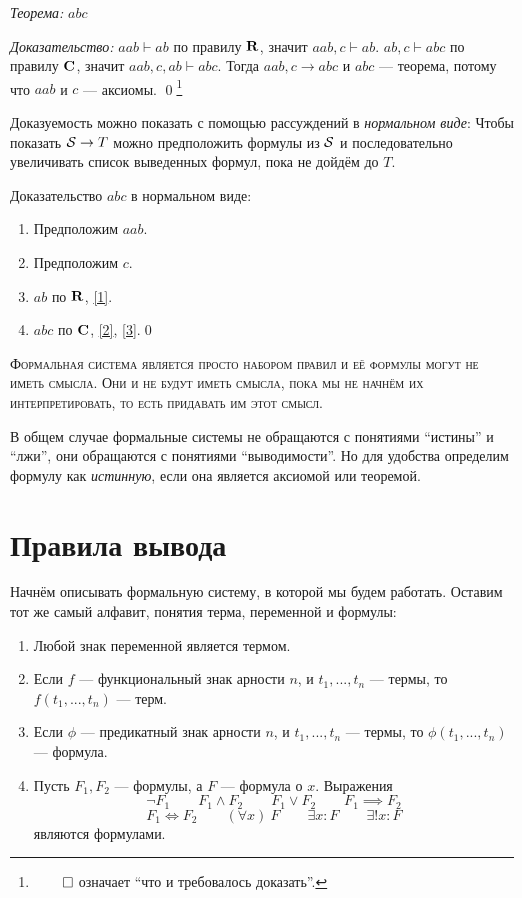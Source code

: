 {\it Теорема:} $abc$

{\it Доказательство:}
$aab\vdash ab$ по правилу $\mathbf{R}$, значит $aab,c\vdash ab$.
$ab,c\vdash abc$ по правилу $\mathbf{C}$, значит $aab,c,ab\vdash abc$.
Тогда $aab,c\to abc$ и $abc$ --- теорема, потому что $aab$ и $c$ --- аксиомы.
\qed\footnote{$\qed$ означает ``что и требовалось доказать''.}

Доказуемость можно показать с помощью рассуждений в {\it нормальном виде}:
Чтобы показать $\mathcal S\to T$ можно предположить формулы из $\mathcal S$ и последовательно
увеличивать список выведенных формул, пока не дойдём до $T$.

\pagebreak

Доказательство $abc$ в нормальном виде:
\begin{enumerate}[label=(\arabic*)]
	\item{}\label{1}Предположим $aab$.
	\item{}\label{2}Предположим $c$.
	\item{}\label{3}$ab$ по $\mathbf{R}$, \ref{1}.
	\item{}\label{4}$abc$ по $\mathbf{C}$, \ref{2}, \ref{3}.\qed
\end{enumerate}

\textsc{Формальная система является просто набором правил и её формулы
	могут не иметь смысла. Они и не будут иметь смысла, пока мы не начнём их
	интерпретировать, то есть придавать им этот смысл.}

В общем случае формальные системы не обращаются с понятиями ``истины'' и ``лжи'',
они обращаются с понятиями ``выводимости''. Но для удобства определим формулу
как {\it истинную}, если она является аксиомой или теоремой.

\section{Правила вывода}

Начнём описывать формальную систему, в которой мы будем работать.
Оставим тот же самый алфавит, понятия терма, переменной и формулы:
\begin{fullwidth}
	\begin{multicols}{2}
		\begin{enumerate}
			\item{}Любой знак переменной является термом.
			\item{}Если $f$ --- функциональный знак арности $n$, и $t_1,...,t_{n}$ --- термы,
			то $f(t_1,...,t_{n})$ --- терм.
			\item{}Если $\phi$ --- предикатный знак арности $n$, и $t_1,...,t_{n}$ --- термы,
			то $\phi(t_1,...,t_{n})$ --- формула.

			\columnbreak

			\item{}Пусть $F_1,F_2$ --- формулы, а $F$ --- формула о $x$. Выражения
			\[
				\lnot F_1\qquad F_1\land F_2\qquad F_1\lor F_2\qquad
				F_1\implies F_2
			\]
			\[
				F_1\iff F_2\qquad (\forall x)~F\qquad
				\exists x:F\qquad \exists! x:F
			\]
			являются формулами.
		\end{enumerate}
	\end{multicols}
\end{fullwidth}

